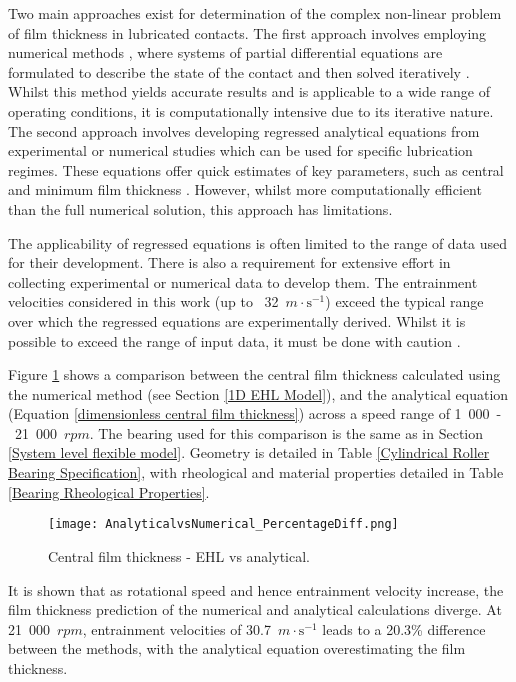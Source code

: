 Two main approaches exist for determination of the complex non-linear problem of film thickness in lubricated contacts. The first approach involves employing numerical methods \cite{Dowson1959}, where systems of partial differential equations are formulated to describe the state of the contact and then solved iteratively \cite{Gohar2018}. Whilst this method yields accurate results and is applicable to a wide range of operating conditions, it is computationally intensive due to its iterative nature. The second approach involves developing regressed analytical equations from experimental or numerical studies which can be used for specific lubrication regimes. These equations offer quick estimates of key parameters, such as central \cite{Dowson1979} and minimum film thickness \cite{Dowson1967}. However, whilst more computationally efficient than the full numerical solution, this approach has limitations.
 
The applicability of regressed equations is often limited to the range of data used for their development. There is also a requirement for extensive effort in collecting experimental or numerical data to develop them. The entrainment velocities considered in this work (up to ~32~$m \cdot \mathrm{s}^{-1}$) exceed the typical range over which the regressed equations are experimentally derived. Whilst it is possible to exceed the range of input data, it must be done with caution \cite{Gohar1988}.

Figure \ref{EHL_NumericalvsAnalytical_25000} shows a comparison between the central film thickness calculated using the numerical method (see Section \ref{1D EHL Model}), and the analytical equation (Equation \ref{dimensionless central film thickness}) across a speed range of 1~000~-~21~000~$rpm$. The bearing used for this comparison is the same as in Section \ref{System level flexible model}. Geometry is detailed in Table \ref{Cylindrical Roller Bearing Specification}, with rheological and material properties detailed in Table \ref{Bearing Rheological Properties}.

\begin{figure}
	\centering
	\texttt{[image: AnalyticalvsNumerical\_PercentageDiff.png]}
	\caption{Central film thickness - EHL vs analytical.}
	\label{EHL_NumericalvsAnalytical_25000}
\end{figure} 

It is shown that as rotational speed and hence entrainment velocity increase, the film thickness prediction of the numerical and analytical calculations diverge. At 21~000~$rpm$, entrainment velocities of 30.7~$m \cdot \mathrm{s}^{-1}$ leads to a 20.3\% difference between the methods, with the analytical equation overestimating the film thickness.

